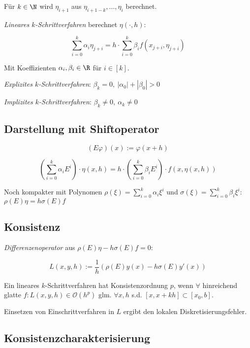 Für $k \in \N$ wird $\eta_{i+1}$ aus $\eta_{i+1-k},\dots,\eta_i$ berechnet.

\emph{Lineares $k$-Schrittverfahren} berechnet $\eta(\cdot,h)$:

$$\sum_{i=0}^k \alpha_i \eta_{j+i} = h \cdot \sum_{i=0}^k \beta_i f(x_{j+i},\eta_{j+i})$$

Mit Koeffizienten $\alpha_i, \beta_i \in \R$ für $i \in [k]$.

\spacing

\emph{Explizites $k$-Schrittverfahren}: $\beta_k = 0, \ |\alpha_0|+|\beta_0| > 0$

\emph{Implizites $k$-Schrittverfahren}: $\beta_k \neq 0, \ \alpha_k \neq 0$

\subsection*{Darstellung mit Shiftoperator}

$$(E\varphi)(x) := \varphi(x+h)$$

\vspace*{-4mm}

$$\left(\sum_{i=0}^k \alpha_i E^i\right) \cdot \eta(x,h) = h \cdot \left(\sum_{i=0}^k \beta_i  E^i\right) \cdot f(x,\eta(x,h))$$

Noch kompakter mit Polynomen $\rho(\xi) = \sum_{i=0}^k \alpha_i \xi^i$ und $\sigma(\xi) = \sum_{i=0}^k \beta_i \xi^i$: $\rho(E)\eta = h \sigma(E) f$

\subsection*{Konsistenz}

\emph{Differenzenoperator} aus $\rho(E)\eta - h\sigma(E)f = 0$:

$$L(x,y,h) := \frac{1}{h}\left(\rho(E)y(x) - h\sigma(E)y'(x)\right)$$

Ein lineares $k$-Schrittverfahren hat Konsistenzordnung $p$, wenn $\forall$ hinreichend glatte $f : L(x,y,h) \in \mathcal{O}(h^p)$ glm. $\forall x, h$ s.d. $[x,x+kh] \subset [x_0,b]$.

\spacing

Einsetzen von Einschrittverfahren in $L$ ergibt den lokalen Diskretisierungsfehler.

\subsection*{Konsistenzcharakterisierung}


